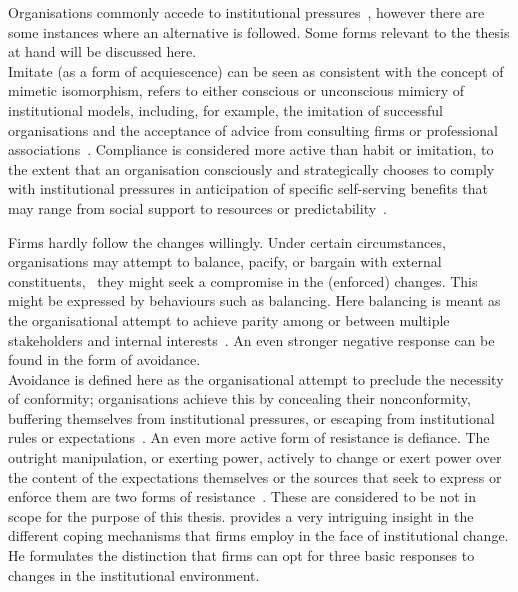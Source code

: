 Organisations commonly accede to institutional pressures~\citep{Oliver:1991tm}, however there are some instances where an alternative is followed. 
Some forms relevant to the thesis at hand will be discussed here.\\
Imitate (as a form of acquiescence) can be seen as consistent with the concept of mimetic isomorphism, refers to either conscious or unconscious mimicry of institutional models, including, for example, the imitation of successful organisations and the acceptance of advice from consulting firms or professional associations~\citep{DiMaggio:1983wt}.
Compliance is considered more active than habit or imitation, to the extent that an organisation consciously and strategically chooses to comply with institutional pressures in anticipation of specific self-serving benefits that may range from social support to resources or predictability~\citep{DiMaggio:1983wt,Meyer:1978if,Pfeffer:2003wp}.

Firms hardly follow the changes willingly.  
Under certain circumstances, organisations may attempt to balance, pacify, or bargain with external constituents,~\citep{Oliver:1991tm} they might seek a compromise in the (enforced) changes. 
This might be expressed by behaviours such as balancing. 
Here balancing is meant as the organisational attempt to achieve parity among or between multiple stakeholders and internal interests~\citep{Oliver:1991tm}.
An even stronger negative response can be found in the form of avoidance. \\
Avoidance is defined here as the organisational attempt to preclude the necessity of conformity; organisations achieve this by concealing their nonconformity, buffering themselves from institutional pressures, or escaping from institutional rules or expectations~\citep{Oliver:1991tm}.
An even more active form of resistance is defiance.
The outright manipulation, or exerting power, actively to change or exert power over the content of the expectations themselves or the sources that seek to express or enforce them are two forms of resistance~\citep{Oliver:1991tm}.
These are considered to be not in scope for the purpose of this thesis.
\cite{Cantwell:2009hg} provides a very intriguing insight in the different coping mechanisms that firms employ in the face of institutional change.
He formulates the distinction that firms can opt for three basic responses to changes in the institutional environment.

